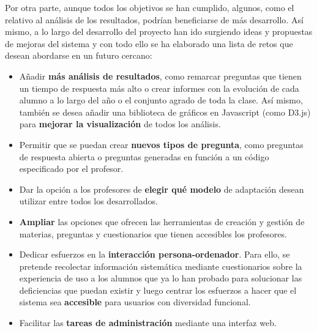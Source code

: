 Por otra parte, aunque todos los objetivos se han cumplido, algunos, como el relativo al análisis de los resultados, podrían beneficiarse de más desarrollo. Así mismo, a lo largo del desarrollo del proyecto han ido surgiendo ideas y propuestas de mejoras del sistema y con todo ello se ha elaborado una lista de retos que desean abordarse en un futuro cercano:

\begin{itemize}
	\item Añadir \textbf{más análisis de resultados}, como remarcar preguntas que tienen un tiempo de respuesta más alto o crear informes con la evolución de cada alumno a lo largo del año o el conjunto agrado de toda la clase. Así mismo, también se desea añadir una biblioteca de gráficos en Javascript (como D3.js) para \textbf{mejorar la visualización} de todos los análisis.
	\item Permitir que se puedan crear \textbf{nuevos tipos de pregunta}, como preguntas de respuesta abierta o preguntas generadas en función a un código especificado por el profesor.
	\item Dar la opción a los profesores de \textbf{elegir qué modelo} de adaptación desean utilizar entre todos los desarrollados.
	\item \textbf{Ampliar} las opciones que ofrecen las herramientas de creación y gestión de materias, preguntas y cuestionarios que tienen accesibles los profesores.
	\item Dedicar esfuerzos en la \textbf{interacción persona-ordenador}. Para ello, se pretende recolectar información sistemática mediante cuestionarios sobre la experiencia de uso a los alumnos que ya lo han probado para solucionar las deficiencias que puedan existir y luego centrar los esfuerzos a hacer que el sistema sea \textbf{accesible} para usuarios con diversidad funcional.
	\item Facilitar las \textbf{tareas de administración} mediante una interfaz web.
\end{itemize}
